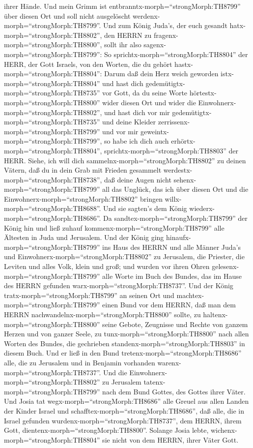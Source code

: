 ihrer Hände. Und mein Grimm ist entbranntx-morph=``strongMorph:TH8799''
über diesen Ort und soll nicht ausgelöscht
werdenx-morph=``strongMorph:TH8799''.  Und zum König
Juda's, der euch gesandt hatx-morph=``strongMorph:TH8802'', den HERRN zu
fragenx-morph=``strongMorph:TH8800'', sollt ihr also
sagenx-morph=``strongMorph:TH8799'': So
sprichtx-morph=``strongMorph:TH8804'' der HERR, der Gott Israels, von
den Worten, die du gehört hastx-morph=``strongMorph:TH8804'':
 Darum daß dein Herz weich geworden
istx-morph=``strongMorph:TH8804'' und hast dich
gedemütigtx-morph=``strongMorph:TH8735'' vor Gott, da du seine Worte
hörtestx-morph=``strongMorph:TH8800'' wider diesen Ort und wider die
Einwohnerx-morph=``strongMorph:TH8802'', und hast dich vor mir
gedemütigtx-morph=``strongMorph:TH8735'' und deine Kleider
zerrissenx-morph=``strongMorph:TH8799'' und vor mir
geweintx-morph=``strongMorph:TH8799'', so habe ich dich auch
erhörtx-morph=``strongMorph:TH8804'',
sprichtx-morph=``strongMorph:TH8803'' der HERR.  Siehe, ich
will dich sammelnx-morph=``strongMorph:TH8802'' zu deinen Vätern, daß du
in dein Grab mit Frieden gesammelt
werdestx-morph=``strongMorph:TH8738'', daß deine Augen nicht
sehenx-morph=``strongMorph:TH8799'' all das Unglück, das ich über diesen
Ort und die Einwohnerx-morph=``strongMorph:TH8802'' bringen
willx-morph=``strongMorph:TH8688''. Und sie sagten's dem König
wiederx-morph=``strongMorph:TH8686''.  Da
sandtex-morph=``strongMorph:TH8799'' der König hin und ließ zuhauf
kommenx-morph=``strongMorph:TH8799'' alle Ältesten in Juda und
Jerusalem.  Und der König ging
hinaufx-morph=``strongMorph:TH8799'' ins Haus des HERRN und alle Männer
Juda's und Einwohnerx-morph=``strongMorph:TH8802'' zu Jerusalem, die
Priester, die Leviten und alles Volk, klein und groß; und wurden vor
ihren Ohren gelesenx-morph=``strongMorph:TH8799'' alle Worte im Buch des
Bundes, das im Hause des HERRN gefunden
warx-morph=``strongMorph:TH8737''.  Und der König
tratx-morph=``strongMorph:TH8799'' an seinen Ort und
machtex-morph=``strongMorph:TH8799'' einen Bund vor dem HERRN, daß man
dem HERRN nachwandelnx-morph=``strongMorph:TH8800'' sollte, zu
haltenx-morph=``strongMorph:TH8800'' seine Gebote, Zeugnisse und Rechte
von ganzem Herzen und von ganzer Seele, zu
tunx-morph=``strongMorph:TH8800'' nach allen Worten des Bundes, die
gechrieben standenx-morph=``strongMorph:TH8803'' in diesem Buch.
 Und er ließ in den Bund
tretenx-morph=``strongMorph:TH8686'' alle, die zu Jerusalem und in
Benjamin vorhanden warenx-morph=``strongMorph:TH8737''. Und die
Einwohnerx-morph=``strongMorph:TH8802'' zu Jerusalem
tatenx-morph=``strongMorph:TH8799'' nach dem Bund Gottes, des Gottes
ihrer Väter.  Und Josia tat
wegx-morph=``strongMorph:TH8686'' alle Greuel aus allen Landen der
Kinder Israel und schafftex-morph=``strongMorph:TH8686'', daß alle, die
in Israel gefunden wurdenx-morph=``strongMorph:TH8737'', dem HERRN,
ihrem Gott, dientenx-morph=``strongMorph:TH8800''. Solange Josia lebte,
wichenx-morph=``strongMorph:TH8804'' sie nicht von dem HERRN, ihrer
Väter Gott.

